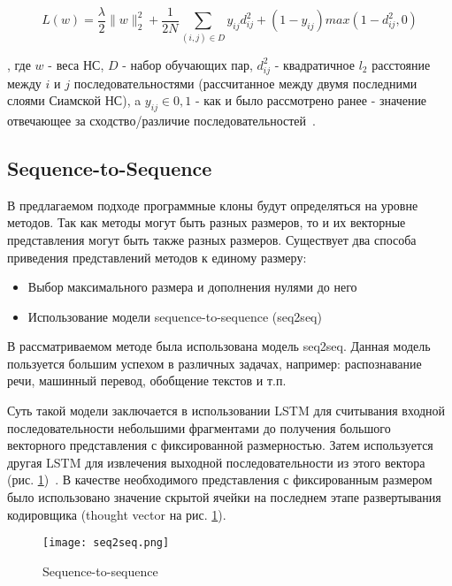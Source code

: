\begin{equation}
\label{eq:contrastive}
L(w)=\frac{\lambda}{2}\|w\|_2^2+\frac{1}{2N}\sum_{(i,j) \in D}y_{ij}d_{ij}^2+(1-y_{ij}) max(1-d_{ij}^2,0)
\end{equation}

, где \(w\) - веса НС, \(D\) - набор обучающих пар, \(d_{ij}^2\) - квадратичное \(l_2\) расстояние между \(i\) и \(j\) последовательностями (рассчитанное между двумя последними слоями Сиамской НС), a \(y_{ij} \in {0,1}\) - как и было рассмотрено ранее - значение отвечающее за сходство/различие последовательностей~\cite{siam}.

\subsection{Sequence-to-Sequence}

В предлагаемом подходе программные клоны будут определяться на уровне методов. Так как методы могут быть разных размеров, то и их векторные представления могут быть также разных размеров. Существует два способа приведения представлений методов к единому размеру:

\begin{itemize}
\setlength\itemsep{0mm}
\item Выбор максимального размера и дополнения нулями до него
\item Использование модели sequence-to-sequence	(seq2seq)
\end{itemize}

В рассматриваемом методе была использована модель seq2seq. Данная модель пользуется большим успехом в различных задачах, например: распознавание речи, машинный перевод, обобщение текстов и т.п.

Суть такой модели заключается в использовании LSTM для считывания входной последовательности небольшими фрагментами до получения большого векторного представления с фиксированной размерностью. Затем используется другая LSTM для извлечения выходной последовательности из этого вектора (рис. \ref{fig:seq2seq})~\cite{seq2seq}. В качестве необходимого представления с фиксированным размером было использовано значение скрытой ячейки на последнем этапе развертывания кодировщика (thought vector на рис. \ref{fig:seq2seq}).

\begin{figure}[htbp]
\centering
\texttt{[image: seq2seq.png]}
\caption{Sequence-to-sequence}
\label{fig:seq2seq}
\end{figure}

